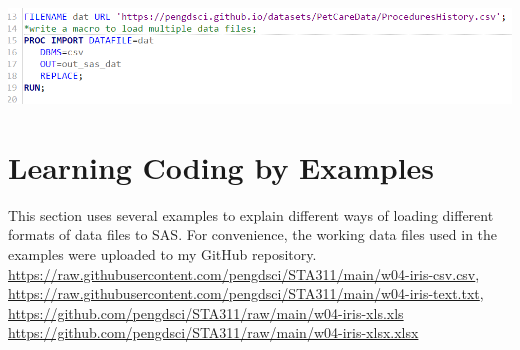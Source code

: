 \documentclass[
]{book}
\begin{document}
\begin{center}\includegraphics[width=1\linewidth]{img04/w04-readDatURL} \end{center}

\hypertarget{learning-coding-by-examples}{%
\section{Learning Coding by Examples}\label{learning-coding-by-examples}}

This section uses several examples to explain different ways of loading different formats of data files to SAS. For convenience, the working data files used in the examples were uploaded to my GitHub repository. \url{https://raw.githubusercontent.com/pengdsci/STA311/main/w04-iris-csv.csv}, \url{https://raw.githubusercontent.com/pengdsci/STA311/main/w04-iris-text.txt},
\url{https://github.com/pengdsci/STA311/raw/main/w04-iris-xls.xls}
\url{https://github.com/pengdsci/STA311/raw/main/w04-iris-xlsx.xlsx}
\end{document}

